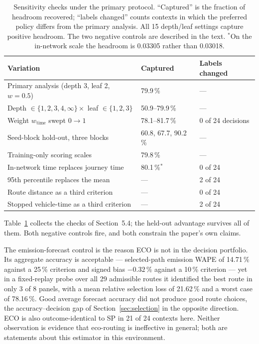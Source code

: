 \documentclass[runningheads]{llncs}
\begin{document}
\begin{table}[htb]
\centering\small
\caption{Sensitivity checks under the primary protocol. ``Captured'' is the fraction of
headroom recovered; ``labels changed'' counts contexts in which the preferred policy
differs from the primary analysis. All 15 depth/leaf settings capture positive headroom.
The two negative controls are described in the text. $^{\ast}$On the in-network scale the
headroom is 0.03305 rather than 0.03018.}
\label{tab:robust}
\setlength{\tabcolsep}{4pt}
\begin{tabular}{@{}lll@{}}
\toprule
Variation & Captured & Labels changed\\
\midrule
Primary analysis (depth 3, leaf 2, $w=0.5$) & 79.9\,\% & ---\\
Depth $\in\{1,2,3,4,\infty\}\times$ leaf $\in\{1,2,3\}$ & 50.9--79.9\,\% & --- \\
Weight $w_{\text{time}}$ swept $0\rightarrow1$ & 78.1--81.7\,\% & 0 of 24 decisions\\
Seed-block hold-out, three blocks & 60.8, 67.7, 90.2\,\% & ---\\
Training-only scoring scales & 79.8\,\% & ---\\
In-network time replaces journey time & 80.1\,\%$^{\ast}$ & 0 of 24\\
95th percentile replaces the mean & --- & 2 of 24\\
Route distance as a third criterion & --- & 0 of 24\\
Stopped vehicle-time as a third criterion & --- & 2 of 24\\
\bottomrule
\end{tabular}
\end{table}

Table~\ref{tab:robust} collects the checks of Section~5.4; the held-out advantage survives
all of them. Both negative controls fire, and both constrain the paper's own claims.

The emission-forecast control is the reason ECO is not in the decision portfolio. Its
aggregate accuracy is acceptable --- selected-path emission WAPE of 14.71\,\% against a
25\,\% criterion and signed bias $-0.32$\,\% against a 10\,\% criterion --- yet in a
fixed-replay probe over all 29 admissible routes it identified the best route in only 3 of
8 panels, with a mean relative selection loss of 21.62\,\% and a worst case of 78.16\,\%.
Good average forecast accuracy did not produce good route choices, the
accuracy--decision gap of Section~\ref{sec:selection} in the opposite direction. ECO is
also outcome-identical to SP in 21 of 24 contexts here. Neither observation is evidence
that eco-routing is ineffective in general; both are statements about this estimator in
this environment.
\end{document}

